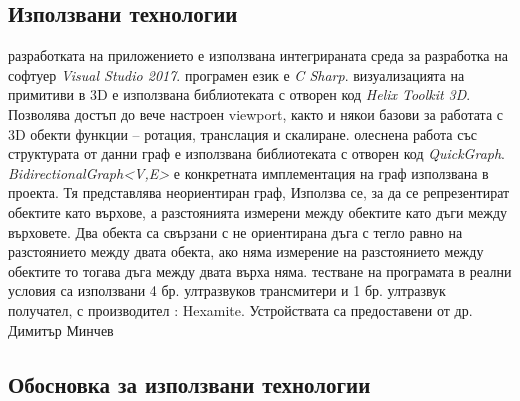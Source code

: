 \subsection{Използвани технологии}
\begin{enumerate}
  разработката на приложението е използвана интегрираната среда за разработка на софтуер \textit{Visual Studio 2017}. 
  програмен език е \textit{C Sharp}. 
  визуализацията на примитиви в 3D е използвана библиотеката с отворен код \textit{Helix Toolkit 3D}. Позволява достъп до вече настроен viewport, както и някои базови за работата с 3D обекти функции – ротация, транслация и скалиране.
  олеснена работа със структурата от данни граф е използвана библиотеката с отворен код \textit{QuickGraph}. \textit{BidirectionalGraph<V,E>} е конкретната имплементация на граф използвана в проекта.  Тя представлява неориентиран граф, Използва се, за да се репрезентират обектите като върхове, а разстоянията измерени между обектите като дъги между върховете. Два обекта са свързани с не ориентирана дъга с тегло равно на разстоянието между двата обекта, ако няма измерение на разстоянието между обектите то тогава дъга между двата върха няма.
  тестване на програмата в реални условия са използвани 4 бр. ултразвуков трансмитери и 1 бр. ултразвук получател, с производител : Hexamite. Устройствата са предоставени от др. Димитър Минчев
\end{enumerate}

\subsection{Обосновка за използвани технологии}

